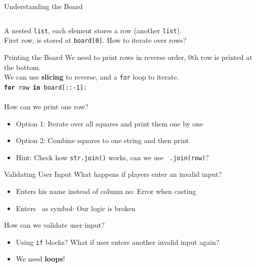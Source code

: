         \begin{frame}{Understanding the Board}
            \LARGE
            \inputminted[frame=single,framesep=2pt,firstline=12,lastline=18]{python3}{code-examples/connect_four.py}
            A nested \texttt{list}, each element stores a row (another \texttt{list}).\\
            First row, is stored at \texttt{board[0]}. How to iterate over rows?
        \end{frame}

        \begin{frame}{Printing the Board}
            \LARGE
            We need to print rows in reverse order, 0th row is printed at the bottom.\\
            We can use \textbf{slicing} to reverse, and a \texttt{for} loop to iterate.\\
            \texttt{\textbf{for} row \textbf{in} board[::-1]:}\\
            \\How can we print one row?
            \begin{itemize}
                \item Option 1: Iterate over all squares and print them one by one
                \item Option 2: Combine squares to one string and then print
                \item Hint: Check how \texttt{str.join()} works, can we use \texttt{\textquotesingle \ \textquotesingle.join(row)}?
            \end{itemize}
        \end{frame}

        \begin{frame}{Validating User Input}
            \LARGE
            What happens if players enter an invalid input?
            \begin{itemize}
                \item Enters his name instead of column no: Error when casting
                \item Enters \textquotesingle *\textquotesingle\ as symbol: Our logic is broken
            \end{itemize}
            How can we validate user input?
            \begin{itemize}
                \item Using \texttt{if} blocks? What if user enters another invalid input again?
                \item We need \textbf{loops}!
            \end{itemize}
        \end{frame}

